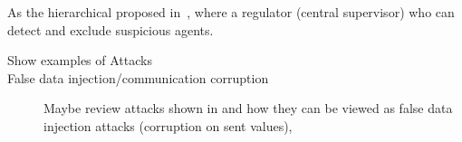\documentclass[../main.tex]{subfiles}
\begin{document}
As the hierarchical proposed in~\cite{BraunEtAl2020}, where a regulator (central supervisor) who can detect and exclude suspicious agents.


\begin{description}
  \item[Show examples of Attacks]
  \item[False data injection/communication corruption] Maybe review attacks shown in \cite{VelardeEtAl2017} and how they can be viewed as false data injection attacks (corruption on sent values), 
\end{description}
\end{document}
